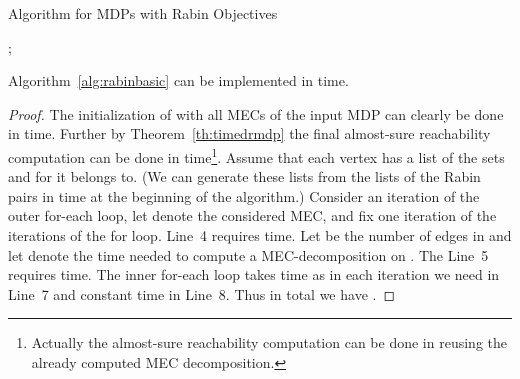 \documentclass[11pt,letterpaper]{article}
\begin{document}
\begin{algorithm}
	\caption{Algorithm for MDPs with Rabin Objectives}
	\label{alg:rabinbasic}
	\BlankLine
	\Output
	{
	
	}
	\BlankLine
	;
	\;
	
	\Return{ \label{lRabinMDPbasic:return}\;}
\end{algorithm}
\begin{proposition}
    Algorithm~\ref{alg:rabinbasic} can be implemented in  time.
\end{proposition}
\begin{proof}
    The initialization of  with all MECs of the input
    MDP  can clearly be done in  time. Further by 
    Theorem~\ref{th:timedrmdp} the final almost-sure reachability computation
    can be done in  time\footnote{
    Actually the almost-sure reachability computation can be done in 
    reusing the already computed MEC decomposition.
    }. 
    Assume that each vertex has a list of the sets  and  for  it belongs to.
    (We can generate these lists from the lists of the Rabin pairs in  time at the beginning of the algorithm.)
    Consider an iteration of the outer for-each loop, 
    let  denote the considered MEC, and fix one iteration  of the  
    iterations of the for loop. Line~4 requires  time.
    Let  be the number of edges in  and let 
     denote the time needed to compute a MEC-decomposition
    on . The Line~5 requires  time. The inner for-each loop takes  time 
    as in each iteration we need  in Line~7 
    and constant time in Line~8. Thus in total we have 
    .
\end{proof}
\end{document}
